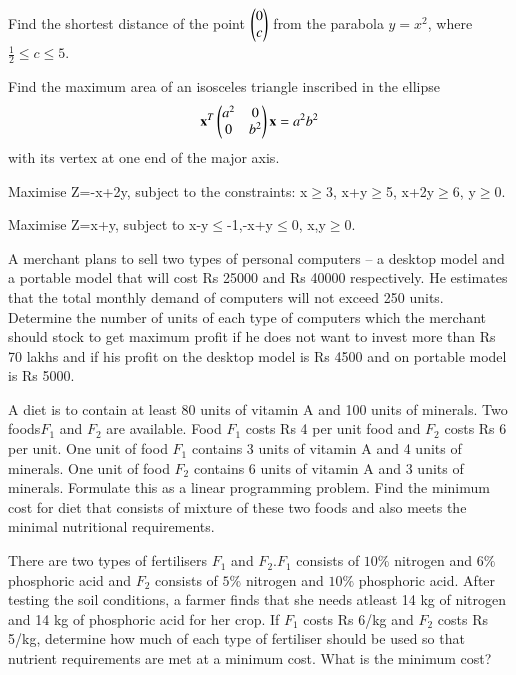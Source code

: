 \item Find the shortest distance of the point $\begin{pmatrix}0\\c\end{pmatrix}$ from the parabola $y = x^2$, where $\frac{1}{2} \le c \le 5$.
\item Find the maximum area of an isosceles triangle inscribed in the ellipse 
%
\begin{align}
\mathbf{x}^T\begin{pmatrix}a^2 & 0 \\ 0 & b^2\end{pmatrix}\mathbf{x} = a^2b^2
\end{align}
%
with its vertex at one end of the major axis.
\item Maximise Z=-x+2y, subject to the constraints:
x$\geq$3, x+y$\geq$5, x+2y$\geq$6, y$\geq$0.\\
\item Maximise Z=x+y, subject to x-y$\leq$-1,-x+y$\leq$0, x,y$\geq$0.\\
\item A merchant plans to sell two types of personal computers – a desktop model and
a portable model that will cost Rs 25000 and Rs 40000 respectively. He estimates
that the total monthly demand of computers will not exceed 250 units. Determine
the number of units of each type of computers which the merchant should stock
to get maximum profit if he does not want to invest more than Rs 70 lakhs and if
his profit on the desktop model is Rs 4500 and on portable model is Rs 5000.\\
\item A diet is to contain at least 80 units of vitamin A and 100 units of minerals. Two
foods$ F_{1}$ and $F_{2}$ are available. Food $F_{1}$ costs Rs 4 per unit food and $F_{2}$ costs
Rs 6 per unit. One unit of food $F_{1}$ contains 3 units of vitamin A and 4 units of
minerals. One unit of food $F_{2}$ contains 6 units of vitamin A and 3 units of minerals.
Formulate this as a linear programming problem. Find the minimum cost for diet
that consists of mixture of these two foods and also meets the minimal nutritional
requirements.\\
\item There are two types of fertilisers $F_{1}$ and $F_{2}$.$F_{1}$ consists of $10\%$ nitrogen and $6\%$
phosphoric acid and $F_{2}$ consists of $5\%$ nitrogen and $10\%$ phosphoric acid. After
testing the soil conditions, a farmer finds that she needs atleast 14 kg of nitrogen
and 14 kg of phosphoric acid for her crop. If $F_{1}$ costs Rs 6/kg and $F_{2}$ costs
Rs 5/kg, determine how much of each type of fertiliser should be used so that
nutrient requirements are met at a minimum cost. What is the minimum cost?\\
